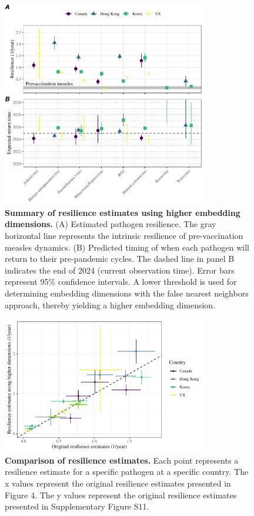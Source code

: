 \documentclass[12pt]{article}
\begin{document}
\pagebreak

\begin{figure}[!th]
\begin{center}
\includegraphics[width=0.8\textwidth]{../figure4_th/figure4_th.pdf}
\caption{
\textbf{Summary of resilience estimates using higher embedding dimensions.}
(A) Estimated pathogen resilience.
The gray horizontal line represents the intrinsic resilience of pre-vaccination measles dynamics.
(B) Predicted timing of when each pathogen will return to their pre-pandemic cycles.
The dashed line in panel B indicates the end of 2024 (current observation time).
Error bars represent 95\% confidence intervals.
A lower threshold is used for determining embedding dimensions with the false nearest neighbors approach, thereby yielding a higher embedding dimension.
}
\end{center}
\end{figure}

\pagebreak

\begin{figure}[!th]
\begin{center}
\includegraphics[width=0.8\textwidth]{../figure4_th/figure4_comparison.pdf}
\caption{
\textbf{Comparison of resilience estimates.}
Each point represents a resilience estimate for a specific pathogen at a specific country.
The x values represent the original resilience estimates presented in Figure 4.
The y values represent the original resilience estimates presented in Supplementary Figure S11.
}
\end{center}
\end{figure}

\pagebreak



\end{document}
